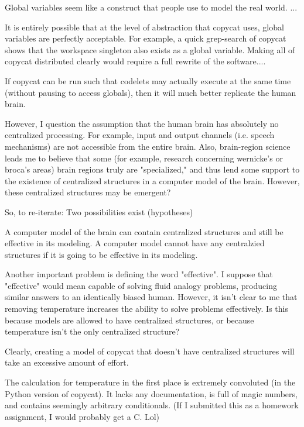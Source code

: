 \documentclass[a4paper]{article}
\begin{document}
    Global variables seem like a construct that people use to model the real world.
    ...

    It is entirely possible that at the level of abstraction that copycat uses, global variables are perfectly acceptable.
    For example, a quick grep-search of copycat shows that the workspace singleton also exists as a global variable.
    Making all of copycat distributed clearly would require a full rewrite of the software....

    If copycat can be run such that codelets may actually execute at the same time (without pausing to access globals), then it will much better replicate the human brain.

    However, I question the assumption that the human brain has absolutely no centralized processing.
    For example, input and output channels (i.e. speech mechanisms) are not accessible from the entire brain.
    Also, brain-region science leads me to believe that some (for example, research concerning wernicke's or broca's areas) brain regions truly are "specialized," and thus lend some support to the existence of centralized structures in a computer model of the brain.
    However, these centralized structures may be emergent?

    So, to re-iterate: Two possibilities exist (hypotheses)

    A computer model of the brain can contain centralized structures and still be effective in its modeling.
    A computer model cannot have any centralzied structures if it is going to be effective in its modeling.

    Another important problem is defining the word "effective".
    I suppose that "effective" would mean capable of solving fluid analogy problems, producing similar answers to an identically biased human.
    However, it isn't clear to me that removing temperature increases the ability to solve problems effectively.
    Is this because models are allowed to have centralized structures, or because temperature isn't the only centralized structure?

    Clearly, creating a model of copycat that doesn't have centralized structures will take an excessive amount of effort.

    \break

    The calculation for temperature in the first place is extremely convoluted (in the Python version of copycat).
    It lacks any documentation, is full of magic numbers, and contains seemingly arbitrary conditionals. 
    (If I submitted this as a homework assignment, I would probably get a C. Lol)
\end{document}
